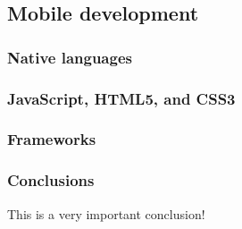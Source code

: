 \subsection{Mobile development}

\subsubsection{Native languages}
\subsubsection{JavaScript, HTML5, and CSS3}
\subsubsection{Frameworks}
\subsubsection{Conclusions}
This is a very important conclusion!
